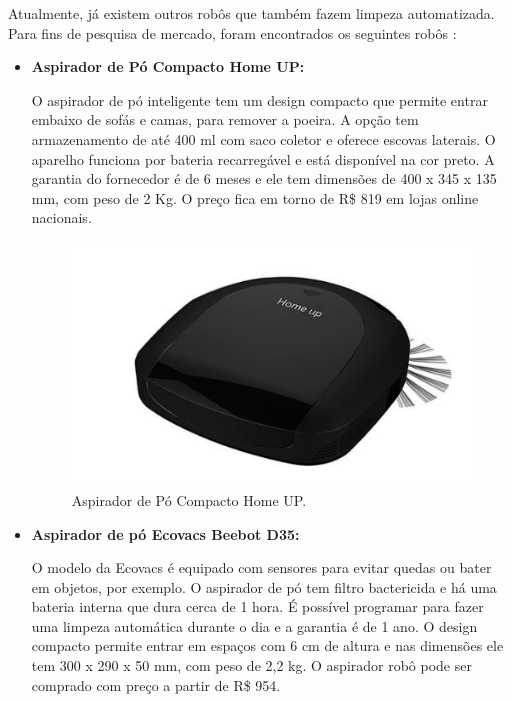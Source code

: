 	Atualmente, já existem outros robôs que também fazem limpeza automatizada. Para fins de pesquisa de mercado, foram encontrados os seguintes robôs \cite{techtudo}:

	\begin{itemize}
		\item \textbf{Aspirador de Pó Compacto Home UP:}

			O aspirador de pó inteligente tem um design compacto que permite entrar embaixo de sofás e camas, para remover a poeira. A opção tem armazenamento de até 400 ml com saco coletor e oferece escovas laterais. O aparelho funciona por bateria recarregável e está disponível na cor preto. A garantia do fornecedor é de 6 meses e ele tem dimensões de 400 x 345 x 135 mm, com peso de 2 Kg. O preço fica em torno de R\$ 819 em lojas online nacionais.

			\begin{figure}[H]
				\centering
				\includegraphics[scale=0.55]{figuras/pm_home_up.png}
				\caption{Aspirador de Pó Compacto Home UP.}
				\label{img:pm_home_up}
			\end{figure}

		\item \textbf{Aspirador de pó Ecovacs Beebot D35:}

			 O modelo da Ecovacs é equipado com sensores para evitar quedas ou bater em objetos, por exemplo. O aspirador de pó tem filtro bactericida e há uma bateria interna que dura cerca de 1 hora. É possível programar para fazer uma limpeza automática durante o dia e a garantia é de 1 ano. O design compacto permite entrar em espaços com 6 cm de altura e nas dimensões ele tem 300 x 290 x 50 mm, com peso de 2,2 kg. O aspirador robô pode ser comprado com preço a partir de R\$ 954.


\end{itemize}
